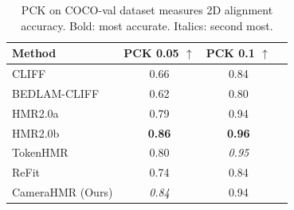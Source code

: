 \begin{table}
\centering
{\scriptsize
\begin{tabular}{lccc}
    \toprule
     Method & PCK 0.05 $\uparrow$ & PCK 0.1 $\uparrow$\\
    \midrule
    CLIFF~\cite{li2022cliff}  & 0.66 & 0.84\\
    BEDLAM-CLIFF~\cite{bedlam} & 0.62 & 0.80\\
    HMR2.0a~\cite{hmr2} & 0.79 & 0.94\\
    HMR2.0b~\cite{hmr2} & \textbf{0.86} & \textbf{0.96}\\
    TokenHMR~\cite{tokenhmr} & 0.80 & \textit{0.95} \\
    ReFit~\cite{refit} & 0.74 &  0.84 \\
    CameraHMR (Ours) & \textit{0.84} & 0.94 \\
    
    \bottomrule
  \end{tabular}
  }
  \caption{PCK on COCO-val dataset measures 2D alignment accuracy. 
  Bold: most accurate. Italics: second most.}
  
\label{pck}

\end{table}




